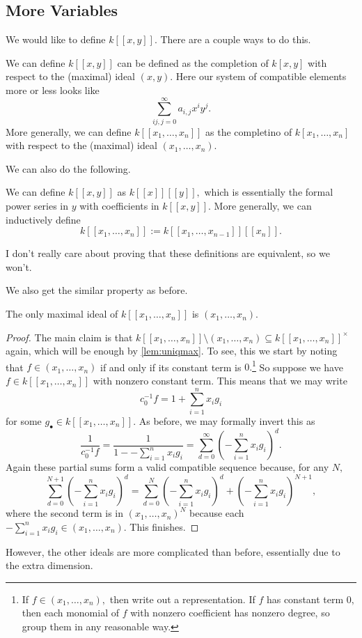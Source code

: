 \subsection{More Variables}
We would like to define $k[[x,y]].$ There are a couple ways to do this.
\begin{definition}
	We can define $k[[x,y]]$ can be defined as the completion of $k[x,y]$ with respect to the (maximal) ideal $(x,y).$ Here our system of compatible elements more or less looks like
	\[\sum_{ij,j=0}^\infty a_{i,j}x^iy^j.\]
	More generally, we can define $k[[x_1,\ldots,x_n]]$ as the completino of $k[x_1,\ldots,x_n]$ with respect to the (maximal) ideal $(x_1,\ldots,x_n).$
\end{definition}
We can also do the following.
\begin{definition}
	We can define $k[[x,y]]$ as $k[[x]][[y]],$ which is essentially the formal power series in $y$ with coefficients in $k[[x,y]].$ More generally, we can inductively define
	\[k[[x_1,\ldots,x_n]]:=k[[x_1,\ldots,x_{n-1}]][[x_n]].\]
\end{definition}
I don't really care about proving that these definitions are equivalent, so we won't.

We also get the similar property as before.
\begin{prop}
	The only maximal ideal of $k[[x_1,\ldots,x_n]]$ is $(x_1,\ldots,x_n).$
\end{prop}
\begin{proof}
	The main claim is that $k[[x_1,\ldots,x_n]]\setminus(x_1,\ldots,x_n)\subseteq k[[x_1,\ldots,x_n]]^\times$ again, which will be enough by \autoref{lem:uniqmax}. To see, this we start by noting that $f\in(x_1,\ldots,x_n)$ if and only if its constant term is $0.$\footnote{If $f\in(x_1,\ldots,x_n),$ then write out a representation. If $f$ has constant term $0,$ then each monomial of $f$ with nonzero coefficient has nonzero degree, so group them in any reasonable way.} So suppose we have $f\in k[[x_1,\ldots,x_n]]$ with nonzero constant term. This means that we may write
	\[c_0^{-1}f=1+\sum_{i=1}^nx_ig_i\]
	for some $g_\bullet\in k[[x_1,\ldots,x_n]].$ As before, we may formally invert this as
	\[\frac1{c_0^{-1}f}=\frac1{1--\sum_{i=1}^nx_ig_i}=\sum_{d=0}^\infty\left(-\sum_{i=1}^nx_ig_i\right)^d.\]
	Again these partial sums form a valid compatible sequence because, for any $N,$
	\[\sum_{d=0}^{N+1}\left(-\sum_{i=1}^nx_ig_i\right)^d=\sum_{d=0}^N\left(-\sum_{i=1}^nx_ig_i\right)^d+\left(-\sum_{i=1}^nx_ig_i\right)^{N+1},\]
	where the second term is in $(x_1,\ldots,x_n)^N$ because each $-\sum_{i=1}^nx_ig_i\in(x_1,\ldots,x_n).$ This finishes.
\end{proof}
However, the other ideals are more complicated than before, essentially due to the extra dimension.

